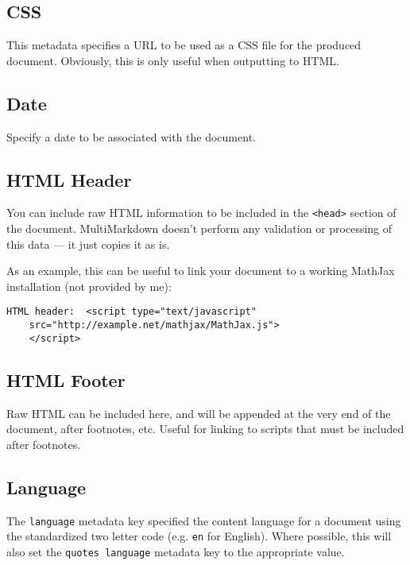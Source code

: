 \subsection{CSS }
\label{css}

This metadata specifies a URL to be used as a CSS file for the produced
document. Obviously, this is only useful when outputting to HTML.

\subsection{Date }
\label{date}

Specify a date to be associated with the document.

\subsection{HTML Header }
\label{htmlheader}

You can include raw HTML information to be included in the \texttt{<head>} section of the document. MultiMarkdown doesn't perform any validation or processing of this data --- it just copies it as is.

As an example, this can be useful to link your document to a working MathJax
installation (not provided by me):

\begin{verbatim}
HTML header:  <script type="text/javascript"
	src="http://example.net/mathjax/MathJax.js">
	</script>
\end{verbatim}

\subsection{HTML Footer }
\label{htmlfooter}

Raw HTML can be included here, and will be appended at the very end of the document, after footnotes, etc. Useful for linking to scripts that must be included after footnotes.

\subsection{Language }
\label{language}

The \texttt{language} metadata key specified the content language for a document using the standardized two letter code (e.g. \texttt{en} for English). Where possible, this will also set the \texttt{quotes language} metadata key to the appropriate value.


